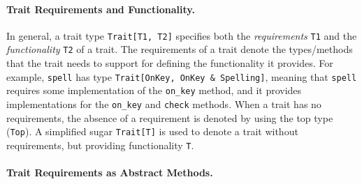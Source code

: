\paragraph{Trait Requirements and Functionality.}
In general, a trait type
\lstinline{Trait[T1, T2]} specifies both the \emph{requirements} \lstinline{T1}
and the \emph{functionality} \lstinline{T2} of a trait. The requirements of a trait denote the types/methods that the
trait needs to support for defining the functionality it provides. %
For example, \lstinline{spell} has type
\lstinline{Trait[OnKey, OnKey & Spelling]}, meaning that \lstinline{spell}
requires some implementation of the \lstinline{on_key} method, and it provides
implementations for the \lstinline{on_key} and \lstinline{check} methods.
When a trait
has no requirements, the absence of a requirement is denoted by using
the top type (\lstinline{Top}). A simplified sugar \lstinline{Trait[T]} is
used to denote a trait without requirements, but providing functionality \lstinline{T}.




\paragraph{Trait Requirements as Abstract Methods.}

